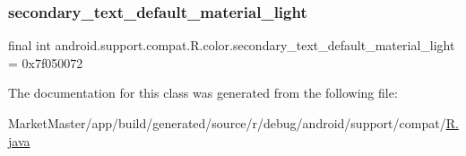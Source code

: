 \subsubsection{\texorpdfstring{secondary\+\_\+text\+\_\+default\+\_\+material\+\_\+light}{secondary\_text\_default\_material\_light}}
{\footnotesize\ttfamily final int android.\+support.\+compat.\+R.\+color.\+secondary\+\_\+text\+\_\+default\+\_\+material\+\_\+light = 0x7f050072\hspace{0.3cm}{\ttfamily [static]}}



The documentation for this class was generated from the following file\+:\begin{DoxyCompactItemize}
\item 
Market\+Master/app/build/generated/source/r/debug/android/support/compat/\mbox{\hyperlink{debug_2android_2support_2compat_2R_8java}{R.\+java}}\end{DoxyCompactItemize}

